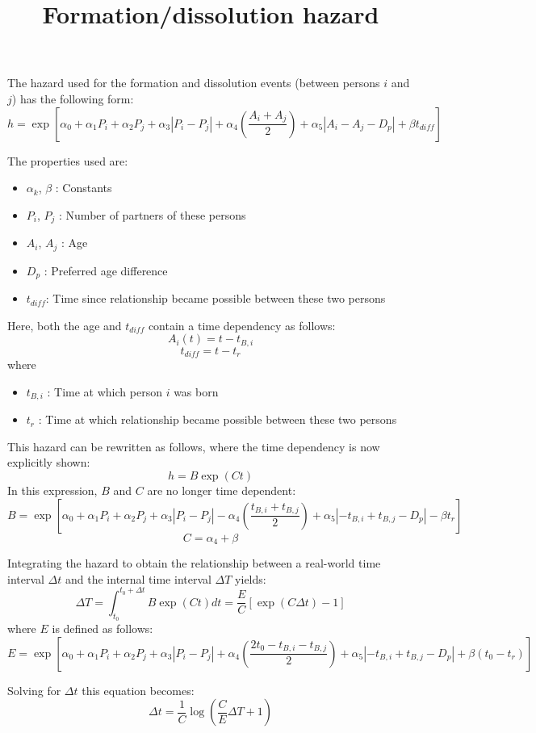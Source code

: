 \documentclass[a4paper,11pt]{article}
\begin{document}
	\title{\bf Formation/dissolution hazard}
	\maketitle

	The hazard used for the formation and dissolution events (between persons $i$ and $j$) has 
	the following form:
	\[ h = \exp\left[ \alpha_0 + \alpha_1 P_i + \alpha_2 P_j  + \alpha_3|P_i - P_j| 
	             +\alpha_4 \left(\frac{A_i+A_j}{2}\right) + \alpha_5 |A_i-A_j-D_p| + \beta t_{diff} \right] \]
	
	The properties used are:
	\begin{itemize}
		\item $\alpha_k$, $\beta$ : Constants
		\item $P_i$, $P_j$ : Number of partners of these persons
		\item $A_i$, $A_j$ : Age
		\item $D_p$ : Preferred age difference
		\item $t_{diff}$: Time since relationship became possible between these two persons
	\end{itemize}

	Here, both the age and $t_{diff}$ contain a time dependency as follows:
	\[ A_i(t) = t - t_{B,i} \]
	\[ t_{diff} = t - t_r \]
	where
	\begin{itemize}
		\item $t_{B,i}$ : Time at which person $i$ was born
		\item $t_r$ : Time at which relationship became possible between these two persons
	\end{itemize}

	This hazard can be rewritten as follows, where the time dependency is now explicitly
	shown:
	\[ h = B\exp(Ct) \]
	In this expression, $B$ and $C$ are no longer time dependent:
	\[ B = \exp\left[ \alpha_0 + \alpha_1 P_i + \alpha_2 P_j  + \alpha_3|P_i - P_j|
	                - \alpha_4\left(\frac{t_{B,i}+t_{B,j}}{2}\right)
					+ \alpha_5|-t_{B,i}+t_{B,j}-D_p| - \beta t_r
					\right] \]
	\[ C = \alpha_4+\beta \]

	Integrating the hazard to obtain the relationship between a real-world time
	interval $\Delta t$ and the internal time interval $\Delta T$ yields:
	\[ \Delta T = \int_{t_0}^{t_0+\Delta t} B \exp(Ct) dt = \frac{E}{C}\left[\exp(C\Delta t) - 1 \right] \]
	where $E$ is defined as follows:
	\[ E = \exp\left[ \alpha_0 + \alpha_1 P_i + \alpha_2 P_j  + \alpha_3|P_i - P_j|
	                + \alpha_4\left(\frac{2t_0 - t_{B,i}-t_{B,j}}{2}\right)
				    + \alpha_5|-t_{B,i}+t_{B,j}-D_p| + \beta (t_0 - t_r) \right] \]

	Solving for $\Delta t$ this equation becomes:
	\[ \Delta t = \frac{1}{C}\log\left(\frac{C}{E}\Delta T + 1\right) \]
\end{document}
